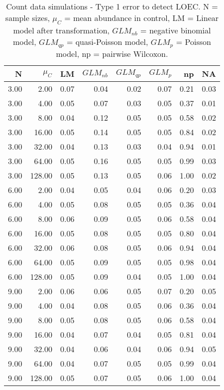 \begin{table}[H]
\centering
\caption{Count data simulations - Type 1 error to detect LOEC. N = sample sizes, 
             $\mu_C$ = mean abundance in control, LM = Linear model after transformation, 
             $GLM_{nb}$ = negative binomial model, $GLM_{qp}$ = quasi-Poisson model, 
            $GLM_{p}$ = Poisson model, np = pairwise Wilcoxon.} 
\label{tab:t1_loec_c}
{\footnotesize
\begin{tabular}{rrrrrrrr}
  \hline
N & $\mu_C$ & LM & $GLM_{nb}$ & $GLM_{qp}$ & $GLM_{p}$ & np & NA \\ 
  \hline
3.00 & 2.00 & 0.07 & 0.04 & 0.02 & 0.07 & 0.21 & 0.03 \\ 
  3.00 & 4.00 & 0.05 & 0.07 & 0.03 & 0.05 & 0.37 & 0.01 \\ 
  3.00 & 8.00 & 0.04 & 0.12 & 0.05 & 0.05 & 0.58 & 0.02 \\ 
  3.00 & 16.00 & 0.05 & 0.14 & 0.05 & 0.05 & 0.84 & 0.02 \\ 
  3.00 & 32.00 & 0.04 & 0.13 & 0.03 & 0.04 & 0.94 & 0.01 \\ 
  3.00 & 64.00 & 0.05 & 0.16 & 0.05 & 0.05 & 0.99 & 0.03 \\ 
  3.00 & 128.00 & 0.05 & 0.13 & 0.05 & 0.06 & 1.00 & 0.02 \\ 
  6.00 & 2.00 & 0.04 & 0.05 & 0.04 & 0.06 & 0.20 & 0.03 \\ 
  6.00 & 4.00 & 0.05 & 0.08 & 0.05 & 0.05 & 0.36 & 0.04 \\ 
  6.00 & 8.00 & 0.06 & 0.09 & 0.05 & 0.06 & 0.58 & 0.04 \\ 
  6.00 & 16.00 & 0.05 & 0.08 & 0.05 & 0.05 & 0.80 & 0.04 \\ 
  6.00 & 32.00 & 0.06 & 0.08 & 0.05 & 0.06 & 0.94 & 0.04 \\ 
  6.00 & 64.00 & 0.05 & 0.09 & 0.05 & 0.05 & 0.98 & 0.04 \\ 
  6.00 & 128.00 & 0.05 & 0.09 & 0.04 & 0.05 & 1.00 & 0.04 \\ 
  9.00 & 2.00 & 0.06 & 0.06 & 0.05 & 0.07 & 0.20 & 0.05 \\ 
  9.00 & 4.00 & 0.04 & 0.08 & 0.05 & 0.06 & 0.36 & 0.04 \\ 
  9.00 & 8.00 & 0.05 & 0.08 & 0.05 & 0.06 & 0.58 & 0.04 \\ 
  9.00 & 16.00 & 0.04 & 0.07 & 0.04 & 0.05 & 0.81 & 0.04 \\ 
  9.00 & 32.00 & 0.04 & 0.06 & 0.04 & 0.06 & 0.94 & 0.05 \\ 
  9.00 & 64.00 & 0.04 & 0.07 & 0.05 & 0.05 & 0.99 & 0.04 \\ 
  9.00 & 128.00 & 0.05 & 0.07 & 0.05 & 0.06 & 1.00 & 0.04 \\ 
   \hline
\end{tabular}
}
\end{table}
